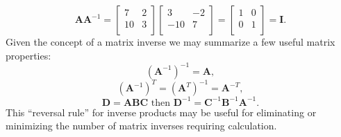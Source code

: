 \begin{equation}
\mathbf{AA}^{-1}=
\left [\begin{array}{cc} 7 & 2\\ 10 & 3\\ 
\end{array} \right] \left [\begin{array}{cc}3 & -2\\ -10 & 7\\ \end{array} \right]=
\left [\begin{array}{ccr} 1 & 0\\ 0 & 1\\ \end{array} \right]=\mathbf{I}.
\end{equation}
Given the concept of a matrix inverse we may summarize a few useful matrix properties:
\begin{equation}
(\mathbf{A}^{-1})^{-1} = \mathbf{A},
\end{equation}
\begin{equation}
(\mathbf{A}^{-1})^T = (\mathbf{A}^T)^{-1} = \mathbf{A}^{-T},
\end{equation}
\begin{equation}
\mathbf{D} = \mathbf{ABC} \mbox{ then } \mathbf{D}^{-1} = \mathbf{C}^{-1} \mathbf{B}^{-1} \mathbf{A}^{-1}.
\end{equation}
	This ``reversal rule'' for inverse products may be useful for eliminating or minimizing the number 
of matrix inverses requiring calculation.

